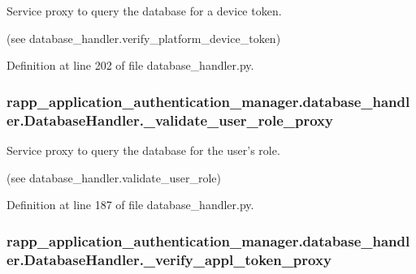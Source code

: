 Service proxy to query the database for a device token. 

(see database\-\_\-handler.\-verify\-\_\-platform\-\_\-device\-\_\-token) 

Definition at line 202 of file database\-\_\-handler.\-py.

\hypertarget{classrapp__application__authentication__manager_1_1database__handler_1_1DatabaseHandler_a2c43b89eb219c26dac8f04bb2fc1701b}{
\subsubsection[{\-\_\-validate\-\_\-user\-\_\-role\-\_\-proxy}]{\setlength{\rightskip}{0pt plus 5cm}rapp\-\_\-application\-\_\-authentication\-\_\-manager.\-database\-\_\-handler.\-Database\-Handler.\-\_\-validate\-\_\-user\-\_\-role\-\_\-proxy\hspace{0.3cm}{\ttfamily [private]}}}\label{classrapp__application__authentication__manager_1_1database__handler_1_1DatabaseHandler_a2c43b89eb219c26dac8f04bb2fc1701b}


Service proxy to query the database for the user's role. 

(see database\-\_\-handler.\-validate\-\_\-user\-\_\-role) 

Definition at line 187 of file database\-\_\-handler.\-py.

\hypertarget{classrapp__application__authentication__manager_1_1database__handler_1_1DatabaseHandler_ae21e898efe1a1b6bcc6ce73b008459e1}{
\subsubsection[{\-\_\-verify\-\_\-appl\-\_\-token\-\_\-proxy}]{\setlength{\rightskip}{0pt plus 5cm}rapp\-\_\-application\-\_\-authentication\-\_\-manager.\-database\-\_\-handler.\-Database\-Handler.\-\_\-verify\-\_\-appl\-\_\-token\-\_\-proxy\hspace{0.3cm}{\ttfamily [private]}}}\label{classrapp__application__authentication__manager_1_1database__handler_1_1DatabaseHandler_ae21e898efe1a1b6bcc6ce73b008459e1}


